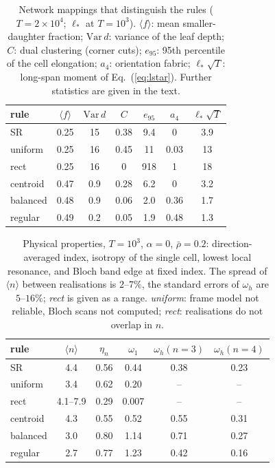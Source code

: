 \documentclass[aps,pre,twocolumn,superscriptaddress,amsmath,amssymb,floatfix]{revtex4-2}
\begin{document}
\begin{table}[tb]
\caption{\label{tab:net}Network mappings that distinguish the rules ($T=2\times10^4$; $\ell_*$
at $T=10^3$). $\langle f\rangle$: mean smaller-daughter fraction; $\mathrm{Var}\,d$: variance
of the leaf depth; $C$: dual clustering (corner cuts); $e_{95}$: 95th percentile of the cell
elongation; $a_4$: orientation fabric; $\ell_*\sqrt T$: long-span moment of
Eq.~(\ref{eq:lstar}). Further statistics are given in the text.}
\begin{ruledtabular}
\begin{tabular}{lcccccc}
rule & $\langle f\rangle$ & $\mathrm{Var}\,d$ & $C$ & $e_{95}$ & $a_4$ & $\ell_*\sqrt T$\\
\hline
SR       & 0.25 & 15  & 0.38 & 9.4 & 0    & 3.9\\
uniform  & 0.25 & 16  & 0.45 & 11  & 0.03 & 13\\
rect     & 0.25 & 16  & 0    & 918 & 1    & 18\\
centroid & 0.47 & 0.9 & 0.28 & 6.2 & 0    & 3.2\\
balanced & 0.48 & 0.9 & 0.06 & 2.0 & 0.36 & 1.7\\
regular  & 0.49 & 0.2 & 0.05 & 1.9 & 0.48 & 1.3\\
\end{tabular}
\end{ruledtabular}
\end{table}

\begin{table}[tb]
\caption{\label{tab:phys}Physical properties, $T=10^3$, $\alpha=0$, $\bar\rho=0.2$:
direction-averaged index, isotropy of the single cell, lowest local resonance, and Bloch
band edge at fixed index. The spread of $\langle n\rangle$ between realisations is
$2$--$7\%$, the standard errors of $\omega_h$ are $5$--$16\%$; \emph{rect} is given as a range.
\emph{uniform}: frame model not reliable, Bloch scans not computed; \emph{rect}: realisations
do not overlap in $n$.}
\begin{ruledtabular}
\begin{tabular}{lccccc}
rule & $\langle n\rangle$ & $\eta_n$ & $\omega_1$ & $\omega_h(n{=}3)$ & $\omega_h(n{=}4)$\\
\hline
SR       & 4.4     & 0.56 & 0.44  & 0.38 & 0.23\\
uniform  & 3.4     & 0.62 & 0.20  & --   & --\\
rect     & 4.1--7.9 & 0.29 & 0.007 & --   & --\\
centroid & 4.3     & 0.55 & 0.52  & 0.55 & 0.31\\
balanced & 3.0     & 0.80 & 1.14  & 0.71 & 0.27\\
regular  & 2.7     & 0.77 & 1.23  & 0.42 & 0.16\\
\end{tabular}
\end{ruledtabular}
\end{table}
\end{document}
